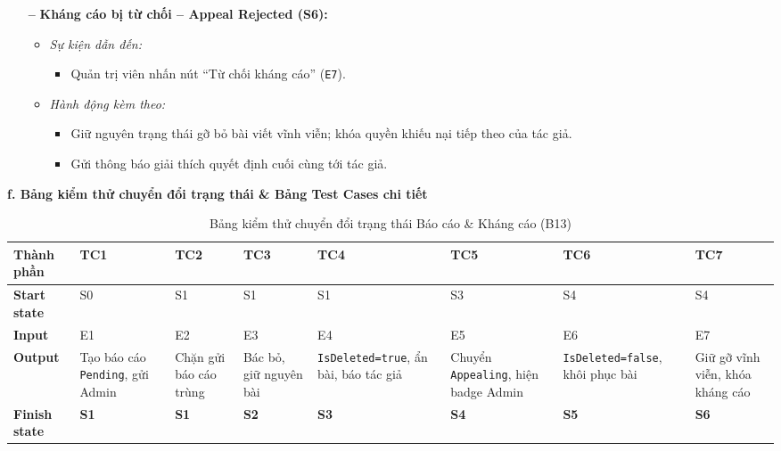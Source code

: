 \documentclass[11pt,a4paper]{article}
\begin{document}
\begin{itemize}[leftmargin=1.2cm, noitemsep]
    \item[\textbf{--}] \textbf{Kháng cáo bị từ chối -- Appeal Rejected (S6):}
    \begin{itemize}[leftmargin=0.8cm, label=--, noitemsep]
        \item \textit{Sự kiện dẫn đến:}
        \begin{itemize}[leftmargin=0.6cm, label=$\ast$, noitemsep]
            \item Quản trị viên nhấn nút ``Từ chối kháng cáo'' (\texttt{E7}).
        \end{itemize}
        \item \textit{Hành động kèm theo:}
        \begin{itemize}[leftmargin=0.6cm, label=$\ast$, noitemsep]
            \item Giữ nguyên trạng thái gỡ bỏ bài viết vĩnh viễn; khóa quyền khiếu nại tiếp theo của tác giả.
            \item Gửi thông báo giải thích quyết định cuối cùng tới tác giả.
        \end{itemize}
    \end{itemize}
\end{itemize}

\noindent\textbf{f. Bảng kiểm thử chuyển đổi trạng thái \& Bảng Test Cases chi tiết}
\begin{table}[H]
\centering
\small
\begin{tabularx}{\textwidth}{|L{1.9cm}|X|X|X|X|X|X|X|}
\hline
{}
\textbf{Thành phần} & \textbf{TC1} & \textbf{TC2} & \textbf{TC3} & \textbf{TC4} & \textbf{TC5} & \textbf{TC6} & \textbf{TC7} \tabularnewline
\hline
\textbf{Start state} & S0 & S1 & S1 & S1 & S3 & S4 & S4 \\ \hline
\textbf{Input} & E1 & E2 & E3 & E4 & E5 & E6 & E7 \\ \hline
\textbf{Output} & Tạo báo cáo \texttt{Pending}, gửi Admin & Chặn gửi báo cáo trùng & Bác bỏ, giữ nguyên bài & \texttt{IsDeleted\allowbreak =true}, ẩn bài, báo tác giả & Chuyển \texttt{Appealing}, hiện badge Admin & \texttt{IsDeleted\allowbreak =false}, khôi phục bài & Giữ gỡ vĩnh viễn, khóa kháng cáo \\ \hline
\textbf{Finish state} & \textbf{S1} & \textbf{S1} & \textbf{S2} & \textbf{S3} & \textbf{S4} & \textbf{S5} & \textbf{S6} \\ \hline
\end{tabularx}
\caption{Bảng kiểm thử chuyển đổi trạng thái Báo cáo \& Kháng cáo (B13)}
\end{table}
\end{document}
